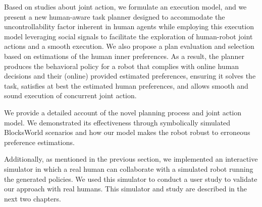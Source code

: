 Based on studies about joint action, we formulate an execution model, and we present a new human-aware task planner designed to accommodate the uncontrollability factor inherent in human agents while employing this execution model leveraging social signals to facilitate the exploration of human-robot joint actions and a smooth execution. 
We also propose a plan evaluation and selection based on estimations of the human inner preferences.
As a result, the planner produces the behavioral policy for a robot that complies with online human decisions and their (online) provided estimated preferences, 
ensuring it solves the task, satisfies at best the estimated human preferences, and allows smooth and sound execution of concurrent joint action.

We provide a detailed account of the novel planning process and joint action model. We demonstrated its effectiveness through symbolically simulated BlocksWorld scenarios and how our model makes the robot robust to erroneous preference estimations.

Additionally, as mentioned in the previous section, we implemented an interactive simulator in which a real human can collaborate with a simulated robot running the generated policies. We used this simulator to conduct a user study to validate our approach with real humans. This simulator and study are described in the next two chapters.  
